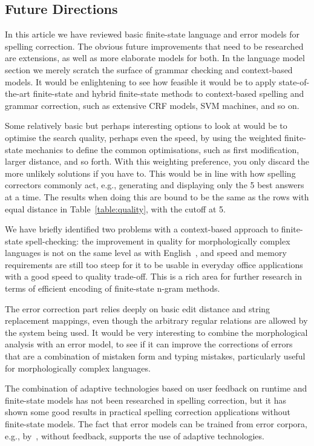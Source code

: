 \documentclass[a4paper,12pt]{article}
\begin{document}
\subsection{Future Directions}
\label{subsec:future}

In this article we have reviewed basic finite-state language and error models
for spelling correction. The obvious future improvements that need to be
researched are extensions, as well as more elaborate models for both. In the language
model section we merely scratch the surface of grammar checking and
context-based models. It would be enlightening to see how feasible it would be to
apply state-of-the-art finite-state and hybrid finite-state methods to
context-based spelling and grammar correction, such as extensive CRF models,
SVM machines, and so on.

Some relatively basic but perhaps interesting options to look at would be to
optimise the search quality, perhaps even the speed, by using the weighted
finite-state mechanics to define the common optimisations, such as first
modification, larger distance, and so forth. With this weighting preference,
you only discard the more unlikely solutions if you have to. This would be in line
with how spelling correctors commonly act, e.g., generating and displaying only
the 5 best answers at a time. The results when doing this are bound to be the same
as the rows with equal distance in Table~\ref{table:quality}, with the cutoff at 5.

We have briefly identified two problems with a context-based approach to
finite-state spell-checking: the improvement in quality for morphologically
complex languages is not on the same level as with
English~\cite[]{wilcoxohearn2008realword}, and speed and memory requirements
are still too steep for it to be usable in everyday office applications with a good
speed to quality trade-off. This is a rich area for further research in terms
of efficient encoding of finite-state n-gram methods.

The error correction part relies deeply on basic edit distance and string
replacement mappings, even though the arbitrary regular relations are allowed
by the system being used. It would be very interesting to combine the morphological
analysis with an error model, to see if it can improve the corrections of errors
that are a combination of mistaken form and typing mistakes, particularly 
useful for morphologically complex languages.

The combination of adaptive technologies based on user feedback on runtime and
finite-state models has not been researched in spelling correction, but it has
shown some good results in practical spelling correction applications without
finite-state models. The fact that error models can be trained from error
corpora, e.g., by~\cite{church1991probability}, without feedback, supports the
use of adaptive technologies.
\end{document}
